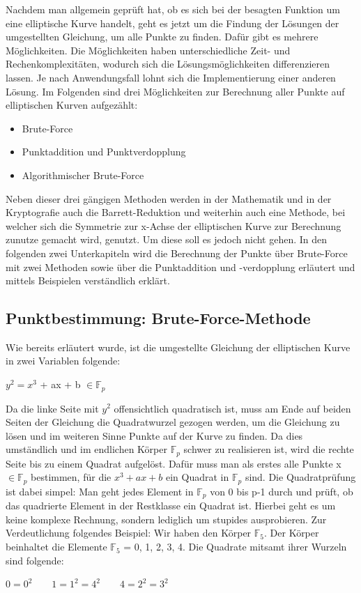 Nachdem man allgemein geprüft hat, ob es sich bei der besagten Funktion um eine elliptische Kurve handelt, geht es jetzt um die Findung der Lösungen der umgestellten Gleichung, um alle Punkte zu finden. Dafür gibt es mehrere Möglichkeiten. Die Möglichkeiten haben unterschiedliche Zeit- und Rechenkomplexitäten, wodurch sich die Lösungsmöglichkeiten differenzieren lassen. Je nach Anwendungsfall lohnt sich die Implementierung einer anderen Lösung. Im Folgenden sind drei Möglichkeiten zur Berechnung aller Punkte auf elliptischen Kurven aufgezählt:

\begin{itemize}
\item Brute-Force
\item Punktaddition und Punktverdopplung
\item Algorithmischer Brute-Force
\end{itemize}

Neben dieser drei gängigen Methoden werden in der Mathematik und in der Kryptografie auch die Barrett-Reduktion und weiterhin auch eine Methode, bei welcher sich die Symmetrie zur x-Achse der elliptischen Kurve zur Berechnung zunutze gemacht wird, genutzt. Um diese soll es jedoch nicht gehen. In den folgenden zwei Unterkapiteln wird die Berechnung der Punkte über Brute-Force mit zwei Methoden sowie über die Punktaddition und -verdopplung erläutert und mittels Beispielen verständlich erklärt.

\subsection{Punktbestimmung: Brute-Force-Methode}\label{sec:brute_force}
Wie bereits erläutert wurde, ist die umgestellte Gleichung der elliptischen Kurve in zwei Variablen folgende:
\begin{center}
$y^{2} =  x^{3}$ + ax + b  $\in \mathbb{F}_{p}$
\end{center}

Da die linke Seite mit $y^{2}$ offensichtlich quadratisch ist, muss am Ende auf beiden Seiten der Gleichung die Quadratwurzel gezogen werden, um die Gleichung zu lösen und im weiteren Sinne Punkte auf der Kurve zu finden. Da dies umständlich und im endlichen Körper $\mathbb{F}_{p}$ schwer zu realisieren ist, wird die rechte Seite bis zu einem Quadrat aufgelöst. Dafür muss man als erstes alle Punkte x $\in \mathbb{F}_{p}$ bestimmen, für die $x^{3} + ax + b$ ein Quadrat in $\mathbb{F}_{p}$ sind. Die Quadratprüfung ist dabei simpel: Man geht jedes Element in $\mathbb{F}_{p}$ von 0 bis p-1 durch und prüft, ob das quadrierte Element in der Restklasse ein Quadrat ist. Hierbei geht es um keine komplexe Rechnung, sondern lediglich um stupides ausprobieren. Zur Verdeutlichung folgendes Beispiel: Wir haben den Körper $\mathbb{F}_{5}$. Der Körper beinhaltet die Elemente $\mathbb{F}_{5}$ = {0, 1, 2, 3, 4}. Die Quadrate mitsamt ihrer Wurzeln sind folgende:
\begin{center}
$0 = 0^{2} \qquad 1 = 1^{2} = 4^{2} \qquad 4 = 2^{2} = 3^{2}$
\end{center}

